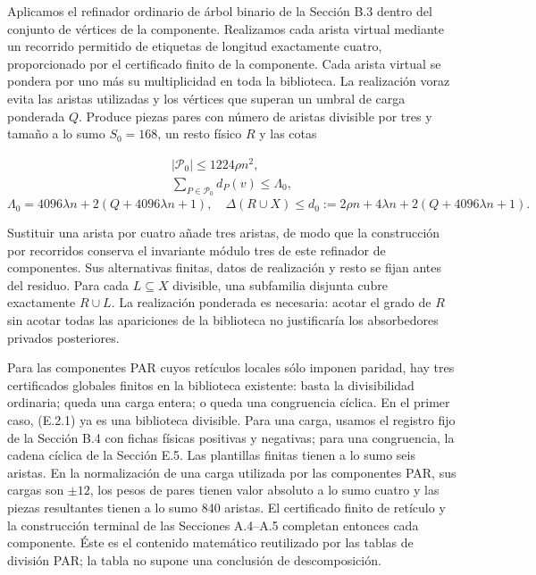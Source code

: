 \documentclass[spanish,11pt,a4paper]{article}
\begin{document}
Aplicamos el refinador ordinario de árbol binario de la Sección B.3 dentro del conjunto de vértices de la componente. Realizamos cada arista virtual mediante un recorrido permitido de etiquetas de longitud exactamente cuatro, proporcionado por el certificado finito de la componente. Cada arista virtual se pondera por uno más su multiplicidad en toda la biblioteca. La realización voraz evita las aristas utilizadas y los vértices que superan un umbral de carga ponderada \(Q\). Produce piezas pares con número de aristas divisible por tres y tamaño a lo sumo \(S_0=168\), un resto físico \(R\) y las cotas

\[\begin{gathered}
|\mathcal P_0|\le1224\rho n^2,\\
\sum_{P\in\mathcal P_0}d_P(v)\le\Lambda_0,
\end{gathered}\] \[\Lambda_0=4096\lambda n+2(Q+4096\lambda n+1),
\quad
\Delta(R\cup X)\le d_0:=2\rho n+4\lambda n+2(Q+4096\lambda n+1).
\tag{E.2.1}\]

Sustituir una arista por cuatro añade tres aristas, de modo que la construcción por recorridos conserva el invariante módulo tres de este refinador de componentes. Sus alternativas finitas, datos de realización y resto se fijan antes del residuo. Para cada \(L\subseteq X\) divisible, una subfamilia disjunta cubre exactamente \(R\cup L\). La realización ponderada es necesaria: acotar el grado de \(R\) sin acotar todas las apariciones de la biblioteca no justificaría los absorbedores privados posteriores.

Para las componentes PAR cuyos retículos locales sólo imponen paridad, hay tres certificados globales finitos en la biblioteca existente: basta la divisibilidad ordinaria; queda una carga entera; o queda una congruencia cíclica. En el primer caso, (E.2.1) ya es una biblioteca divisible. Para una carga, usamos el registro fijo de la Sección B.4 con fichas físicas positivas y negativas; para una congruencia, la cadena cíclica de la Sección E.5. Las plantillas finitas tienen a lo sumo seis aristas. En la normalización de una carga utilizada por las componentes PAR, sus cargas son \(\pm12\), los pesos de pares tienen valor absoluto a lo sumo cuatro y las piezas resultantes tienen a lo sumo 840 aristas. El certificado finito de retículo y la construcción terminal de las Secciones A.4--A.5 completan entonces cada componente. Éste es el contenido matemático reutilizado por las tablas de división PAR; la tabla no supone una conclusión de descomposición.
\end{document}
